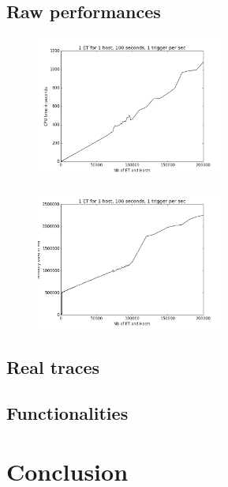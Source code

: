 \documentclass[a4paper]{IEEEtran}
\begin{document}
  \subsection{Raw performances}
    \begin{figure}
      \label{time_raw}
      \centering
      \includegraphics[width=0.55\textwidth]{../plots/raw_perf_time}
    \end{figure}
    \begin{figure}
      \label{mem_raw}
      \centering
      \includegraphics[width=0.55\textwidth]{../plots/raw_perf_mem}
    \end{figure}
  \subsection{Real traces}
  \subsection{Functionalities}

\section{Conclusion} \label{conclu}





\end{document}
